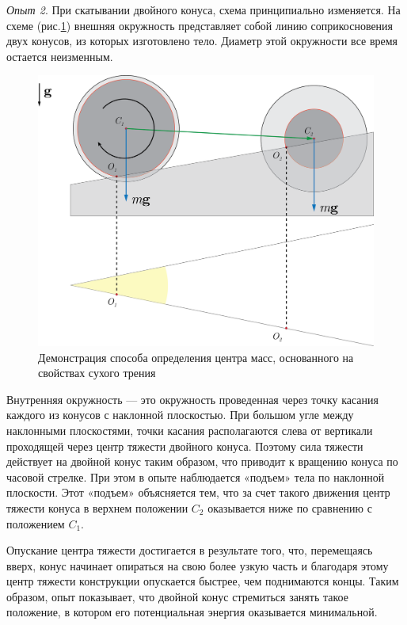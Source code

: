 \documentclass[14pt,a4paper,oneside]{extarticle}	%
\begin{document}
	\textit{Опыт 2}. При скатывании двойного конуса, схема принципиально изменяется.
	На схеме (рис.\ref{center-4}) внешняя окружность представляет собой линию соприкосновения двух конусов, из которых изготовлено тело.
	Диаметр этой окружности все время остается неизменным.
			\begin{figure}[H] 	
		\centering 	
		\includegraphics[width=0.75\linewidth]{center-4.png}
		\caption{Демонстрация способа определения центра масс, основанного на свойствах сухого трения}
		\label{center-4}
	\end{figure}

	Внутренняя окружность — это окружность проведенная через точку касания каждого из конусов с наклонной плоскостью.
	 При большом угле между наклонными плоскостями, точки касания располагаются слева от вертикали проходящей через центр тяжести двойного конуса. Поэтому сила тяжести действует на двойной конус таким образом, что приводит к вращению конуса по часовой стрелке. 
	 При этом в опыте наблюдается «подъем» тела по наклонной плоскости.
	 Этот «подъем» объясняется тем, что за счет такого движения центр тяжести конуса в верхнем положении $ C_{2} $ оказывается ниже по сравнению с положением $ C_{1} $.

	Опускание центра тяжести достигается в результате того, что, перемещаясь вверх, конус начинает опираться на свою более узкую часть и благодаря этому центр тяжести конструкции опускается быстрее, чем поднимаются концы.
	Таким образом, опыт показывает, что двойной конус стремиться занять такое положение, в котором его потенциальная энергия оказывается минимальной.
	
\end{document}
